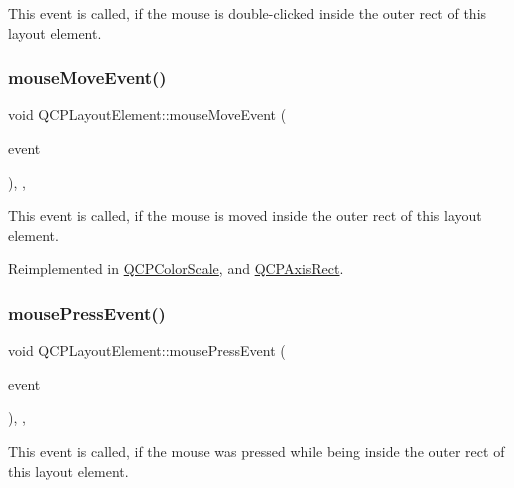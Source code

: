 This event is called, if the mouse is double-\/clicked inside the outer rect of this layout element. \mbox{\label{class_q_c_p_layout_element_a14f4acf58cdb8dd2c6c571479c4c4a40}} 
\subsubsection{\texorpdfstring{mouse\+Move\+Event()}{mouseMoveEvent()}}
{\footnotesize\ttfamily void Q\+C\+P\+Layout\+Element\+::mouse\+Move\+Event (\begin{DoxyParamCaption}\item[{Q\+Mouse\+Event $\ast$}]{event }\end{DoxyParamCaption})\hspace{0.3cm}{\ttfamily [inline]}, {\ttfamily [protected]}, {\ttfamily [virtual]}}

This event is called, if the mouse is moved inside the outer rect of this layout element. 

Reimplemented in \mbox{\hyperlink{class_q_c_p_color_scale_a3aca469d531ce7b5882de73590aa0de6}{Q\+C\+P\+Color\+Scale}}, and \mbox{\hyperlink{class_q_c_p_axis_rect_a4baf3d5dd69166788f6ceda0ea182c6e}{Q\+C\+P\+Axis\+Rect}}.

\mbox{\label{class_q_c_p_layout_element_a2d82ea21fe0ee628f177bd824bc51a71}} 
\subsubsection{\texorpdfstring{mouse\+Press\+Event()}{mousePressEvent()}}
{\footnotesize\ttfamily void Q\+C\+P\+Layout\+Element\+::mouse\+Press\+Event (\begin{DoxyParamCaption}\item[{Q\+Mouse\+Event $\ast$}]{event }\end{DoxyParamCaption})\hspace{0.3cm}{\ttfamily [inline]}, {\ttfamily [protected]}, {\ttfamily [virtual]}}

This event is called, if the mouse was pressed while being inside the outer rect of this layout element. 

